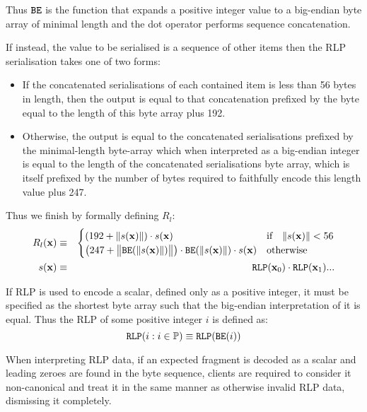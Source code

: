 \documentclass[9pt,oneside]{amsart}
\begin{document}
Thus $\mathtt{\tiny BE}$ is the function that expands a positive integer value to a big-endian byte array of minimal length and the dot operator performs sequence concatenation.

If instead, the value to be serialised is a sequence of other items then the RLP serialisation takes one of two forms:

\begin{itemize}
\item If the concatenated serialisations of each contained item is less than 56 bytes in length, then the output is equal to that concatenation prefixed by the byte equal to the length of this byte array plus 192.
\item Otherwise, the output is equal to the concatenated serialisations prefixed by the minimal-length byte-array which when interpreted as a big-endian integer is equal to the length of the concatenated serialisations byte array, which is itself prefixed by the number of bytes required to faithfully encode this length value plus 247.
\end{itemize}

Thus we finish by formally defining $R_l$:
\begin{eqnarray}
R_l(\mathbf{x}) & \equiv & \begin{cases}
(192 + \lVert s(\mathbf{x}) \rVert) \cdot s(\mathbf{x}) & \text{if} \quad \lVert s(\mathbf{x}) \rVert < 56 \\
\big(247 + \big\lVert \mathtt{\tiny BE}(\lVert s(\mathbf{x}) \rVert) \big\rVert \big) \cdot \mathtt{\tiny BE}(\lVert s(\mathbf{x}) \rVert) \cdot s(\mathbf{x}) & \text{otherwise}
\end{cases} \\
s(\mathbf{x}) & \equiv & \mathtt{\tiny RLP}(\mathbf{x}_0) \cdot \mathtt{\tiny RLP}(\mathbf{x}_1) ...
\end{eqnarray}

If RLP is used to encode a scalar, defined only as a positive integer, it must be specified as the shortest byte array such that the big-endian interpretation of it is equal. Thus the RLP of some positive integer $i$ is defined as:
\begin{equation}
\mathtt{\tiny RLP}(i : i \in \mathbb{P}) \equiv \mathtt{\tiny RLP}(\mathtt{\tiny BE}(i))
\end{equation}

When interpreting RLP data, if an expected fragment is decoded as a scalar and leading zeroes are found in the byte sequence, clients are required to consider it non-canonical and treat it in the same manner as otherwise invalid RLP data, dismissing it completely.
\end{document}
